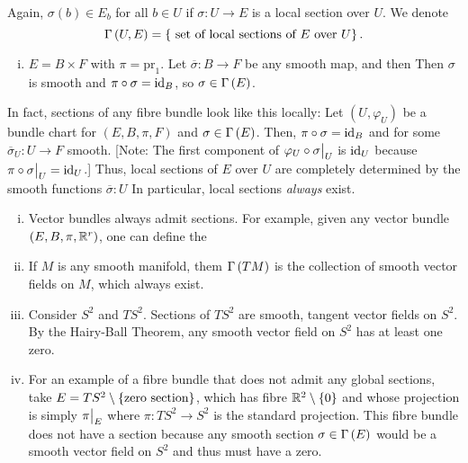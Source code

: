 \documentclass[main.tex]{subfiles}
\begin{document}
\begin{note}
Again, $\sigma(b) \in E_b$ for all $b \in U$ if $\sigma: U \to E$ is a local section over $U$. We denote \[
\Gamma\left( U,E \right) = \left\{ \text{ set of local sections of $E$ over $U$} \right\}.
\]
\end{note}

\begin{exmp}
\begin{enumerate}[(i)]
    \item $E = B \times F$ with $\pi = \text{pr}_1$. Let $\overline{\sigma}: B \to F$ be any smooth map, and then
    Then $\sigma$ is smooth and $\pi \circ \sigma = \text{id}_{B}$, so $\sigma \in \Gamma\left( E \right)$.
\end{enumerate}
\end{exmp}

In fact, sections of any fibre bundle look like this locally: Let $(U, \varphi_U)$ be a bundle chart for $(E, B, \pi, F)$ and $\sigma \in \Gamma\left( E \right)$. Then, $\pi \circ \sigma = \text{id}_{B}$ and
for some $\overline{\sigma}_U : U \to F$ smooth. [Note: The first component of $\varphi_U \circ \sigma\big|_{U}$ is $\text{id}_{U}$ because $\pi \circ \sigma\big|_{U} = \text{id}_{U}$.] Thus, local sections of $E$ over $U$ are completely determined by the smooth functions $\overline{\sigma}: U$ In particular, local sections {\it always} exist.

\begin{exmp}
\begin{enumerate}[(i)]
    \item Vector bundles always admit sections. For example, given any vector bundle $(E, B, \pi, \mathbb{R}^r)$, one can define the 
    \item If $M$ is any smooth manifold, them $\Gamma\left( TM \right)$ is the collection of smooth vector fields on $M$, which always exist.

    \item Consider $S^2$ and $TS^2$. Sections of $TS^2$ are smooth, tangent vector fields on $S^2$. By the Hairy-Ball Theorem, any smooth vector field on $S^2$ has at least one zero.

    \item For an example of a fibre bundle that does not admit any global sections, take $E = TS^2 \setminus \left\{ \text{zero section}\right\}$, which has fibre $\mathbb{R}^2 \setminus \left\{0\right\}$ and whose projection is simply $\pi\big|_{E}$ where $\pi: TS^2 \to S^2$ is the standard projection. This fibre bundle does not have a section because any smooth section $\sigma \in \Gamma\left( E \right)$ would be a smooth vector field on $S^2$ and thus must have a zero.
\end{enumerate}
\end{exmp}
\end{document}
